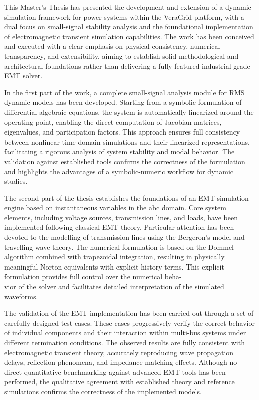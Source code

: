 
This Master's Thesis has presented the development and extension of a dynamic simulation framework for power 
systems within the VeraGrid platform, with a dual focus on small-signal stability analysis and the 
foundational implementation of electromagnetic transient simulation capabilities. 
The work has been conceived and executed with a clear emphasis on physical consistency, numerical transparency,
 and extensibility, aiming to establish solid methodological and architectural foundations rather than 
 delivering a fully featured industrial-grade EMT solver.

In the first part of the work, a complete small-signal analysis module for RMS dynamic models has been 
developed. Starting from a symbolic formulation of differential-algebraic equations, the system is 
automatically linearized around the operating point, enabling the direct computation of Jacobian matrices, 
eigenvalues, and participation factors. This approach ensures full consistency between nonlinear time-domain 
simulations and their linearized representations, facilitating a rigorous analysis of system stability and 
modal behavior. The validation against established tools confirms the correctness of the formulation and 
highlights the advantages of a symbolic-numeric workflow for dynamic studies.

The second part of the thesis establishes the foundations of an EMT simulation engine based on instantaneous 
variables in the abc domain. Core system elements, including voltage sources, transmission lines, 
and loads, have been implemented following classical EMT theory. Particular attention has been devoted 
to the modelling of transmission lines using the Bergeron's model and travelling-wave theory. 
The numerical formulation is based on the Dommel algorithm combined with trapezoidal integration, 
resulting in physically meaningful Norton equivalents with explicit history terms.
 This explicit formulation provides full control over the numerical beha-\\vior of the solver and facilitates 
 detailed interpretation of the simulated waveforms.

The validation of the EMT implementation has been carried out through a set of carefully designed test cases. 
These cases progressively verify the correct behavior of individual components and their interaction 
within multi-bus systems under different termination conditions. The observed results are fully consistent 
with electromagnetic transient theory, accurately reproducing wave propagation delays, reflection phenomena, 
and impedance-matching effects. Although no direct quantitative benchmarking against advanced EMT tools has
 been performed, the qualitative agreement with established theory and reference simulations confirms the 
 correctness of the implemented models.

